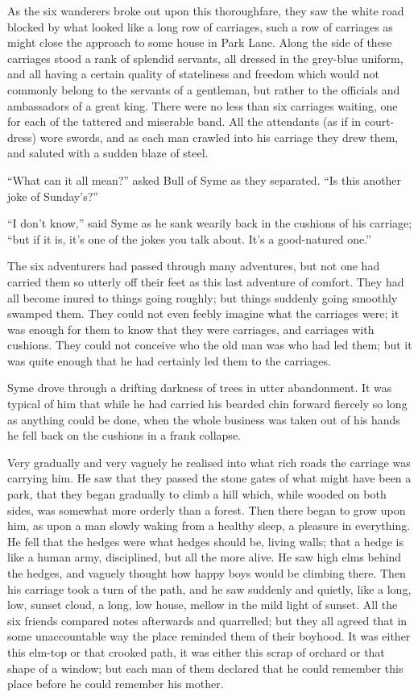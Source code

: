 \documentclass{book}
\begin{document}
As the six wanderers broke out upon this thoroughfare, they saw the white road blocked by what looked like a long row of carriages, such a row of carriages as might close the approach to some house in Park Lane. Along the side of these carriages stood a rank of splendid servants, all dressed in the grey-blue uniform, and all having a certain quality of stateliness and freedom which would not commonly belong to the servants of a gentleman, but rather to the officials and ambassadors of a great king. There were no less than six carriages waiting, one for each of the tattered and miserable band. All the attendants (as if in court-dress) wore swords, and as each man crawled into his carriage they drew them, and saluted with a sudden blaze of steel.

“What can it all mean?” asked Bull of Syme as they separated. “Is this another joke of Sunday’s?”

“I don’t know,” said Syme as he sank wearily back in the cushions of his carriage; “but if it is, it’s one of the jokes you talk about. It’s a good-natured one.”

The six adventurers had passed through many adventures, but not one had carried them so utterly off their feet as this last adventure of comfort. They had all become inured to things going roughly; but things suddenly going smoothly swamped them. They could not even feebly imagine what the carriages were; it was enough for them to know that they were carriages, and carriages with cushions. They could not conceive who the old man was who had led them; but it was quite enough that he had certainly led them to the carriages.

Syme drove through a drifting darkness of trees in utter abandonment. It was typical of him that while he had carried his bearded chin forward fiercely so long as anything could be done, when the whole business was taken out of his hands he fell back on the cushions in a frank collapse.

Very gradually and very vaguely he realised into what rich roads the carriage was carrying him. He saw that they passed the stone gates of what might have been a park, that they began gradually to climb a hill which, while wooded on both sides, was somewhat more orderly than a forest. Then there began to grow upon him, as upon a man slowly waking from a healthy sleep, a pleasure in everything. He fell that the hedges were what hedges should be, living walls; that a hedge is like a human army, disciplined, but all the more alive. He saw high elms behind the hedges, and vaguely thought how happy boys would be climbing there. Then his carriage took a turn of the path, and he saw suddenly and quietly, like a long, low, sunset cloud, a long, low house, mellow in the mild light of sunset. All the six friends compared notes afterwards and quarrelled; but they all agreed that in some unaccountable way the place reminded them of their boyhood. It was either this elm-top or that crooked path, it was either this scrap of orchard or that shape of a window; but each man of them declared that he could remember this place before he could remember his mother.
\end{document}
